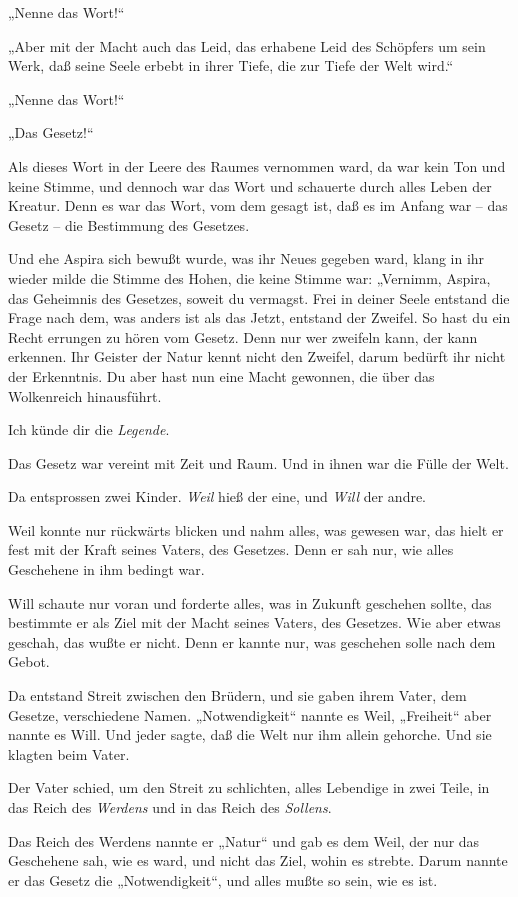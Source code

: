„Nenne das Wort!“

„Aber mit der Macht auch das Leid, das erhabene Leid des Schöpfers
um sein Werk, daß seine Seele erbebt in ihrer Tiefe, die zur Tiefe
der Welt wird.“

„Nenne das Wort!“

„Das Gesetz!“

Als dieses Wort in der Leere des Raumes vernommen ward, da war kein
Ton und keine Stimme, und dennoch war das Wort und schauerte durch
alles Leben der Kreatur. Denn es war das Wort, vom dem gesagt ist,
daß es im Anfang war – das Gesetz – die Bestimmung des Gesetzes.

Und ehe Aspira sich bewußt wurde, was ihr Neues gegeben ward, klang
in ihr wieder milde die Stimme des Hohen, die keine Stimme war:
„Vernimm, Aspira, das Geheimnis des Gesetzes, soweit du vermagst.
Frei in deiner Seele entstand die Frage nach dem, was anders ist
als das Jetzt, entstand der Zweifel. So hast du ein Recht errungen
zu hören vom Gesetz. Denn nur wer zweifeln kann, der kann erkennen.
Ihr Geister der Natur kennt nicht den Zweifel, darum bedürft ihr
nicht der Erkenntnis. Du aber hast nun eine Macht gewonnen, die
über das Wolkenreich hinausführt.

Ich künde dir die \emph{Legende}.

Das Gesetz war vereint mit Zeit und Raum. Und in ihnen war die
Fülle der Welt.

Da entsprossen zwei Kinder. \emph{Weil} hieß der eine, und
\emph{Will} der andre.

Weil konnte nur rückwärts blicken und nahm alles, was gewesen war,
das hielt er fest mit der Kraft seines Vaters, des Gesetzes. Denn
er sah nur, wie alles Geschehene in ihm bedingt war.

Will schaute nur voran und forderte alles, was in Zukunft geschehen
sollte, das bestimmte er als Ziel mit der Macht seines Vaters, des
Gesetzes. Wie aber etwas geschah, das wußte er nicht. Denn er
kannte nur, was geschehen solle nach dem Gebot.

Da entstand Streit zwischen den Brüdern, und sie gaben ihrem Vater,
dem Gesetze, verschiedene Namen. „Notwendigkeit“ nannte es Weil,
„Freiheit“ aber nannte es Will. Und jeder sagte, daß die Welt nur
ihm allein gehorche. Und sie klagten beim Vater.

Der Vater schied, um den Streit zu schlichten, alles Lebendige in
zwei Teile, in das Reich des \emph{Werdens} und in das Reich des
\emph{Sollens}.

Das Reich des Werdens nannte er „Natur“ und gab es dem Weil, der
nur das Geschehene sah, wie es ward, und nicht das Ziel, wohin es
strebte. Darum nannte er das Gesetz die „Notwendigkeit“, und alles
mußte so sein, wie es ist.

